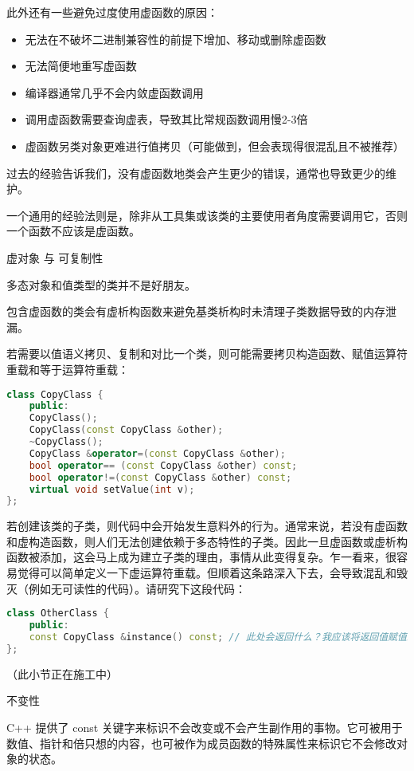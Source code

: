 此外还有一些避免过度使用虚函数的原因：

\begin{itemize}
\item 无法在不破坏二进制兼容性的前提下增加、移动或删除虚函数
\item 无法简便地重写虚函数
\item 编译器通常几乎不会内敛虚函数调用
\item 调用虚函数需要查询虚表，导致其比常规函数调用慢2-3倍
\item 虚函数另类对象更难进行值拷贝（可能做到，但会表现得很混乱且不被推荐）
\end{itemize}

过去的经验告诉我们，没有虚函数地类会产生更少的错误，通常也导致更少的维护。

一个通用的经验法则是，除非从工具集或该类的主要使用者角度需要调用它，否则一个函数不应该是虚函数。

虚对象 与 可复制性

多态对象和值类型的类并不是好朋友。

包含虚函数的类会有虚析构函数来避免基类析构时未清理子类数据导致的内存泄漏。

若需要以值语义拷贝、复制和对比一个类，则可能需要拷贝构造函数、赋值运算符重载和等于运算符重载：

\begin{lstlisting}[language=C++]
class CopyClass {
	public:
	CopyClass();
	CopyClass(const CopyClass &other);
	~CopyClass();
	CopyClass &operator=(const CopyClass &other);
	bool operator== (const CopyClass &other) const;
	bool operator!=(const CopyClass &other) const;
	virtual void setValue(int v);
};
\end{lstlisting}

若创建该类的子类，则代码中会开始发生意料外的行为。通常来说，若没有虚函数和虚构造函数，则人们无法创建依赖于多态特性的子类。因此一旦虚函数或虚析构函数被添加，这会马上成为建立子类的理由，事情从此变得复杂。乍一看来，很容易觉得可以简单定义一下虚运算符重载。但顺着这条路深入下去，会导致混乱和毁灭（例如无可读性的代码）。请研究下这段代码：

\begin{lstlisting}[language=C++]
class OtherClass {
	public:
	const CopyClass &instance() const; // 此处会返回什么？我应该将返回值赋值给谁？
};
\end{lstlisting}
（此小节正在施工中）

不变性

C++ 提供了 const 关键字来标识不会改变或不会产生副作用的事物。它可被用于数值、指针和倍只想的内容，也可被作为成员函数的特殊属性来标识它不会修改对象的状态。

